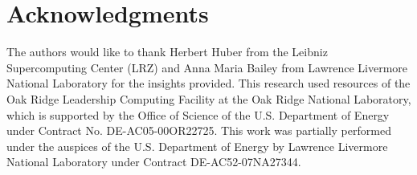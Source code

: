 \section{Acknowledgments}
The authors would like to thank Herbert Huber from the Leibniz Supercomputing Center (LRZ) and Anna Maria Bailey from Lawrence Livermore National Laboratory for the insights provided. This research used resources of the Oak Ridge Leadership Computing Facility at the Oak Ridge National Laboratory, which is supported by the Office of Science of the U.S. Department of Energy under Contract No. DE-AC05-00OR22725. This work was partially performed under the auspices of the U.S. Department of Energy by Lawrence Livermore National Laboratory under Contract DE-AC52-07NA27344.